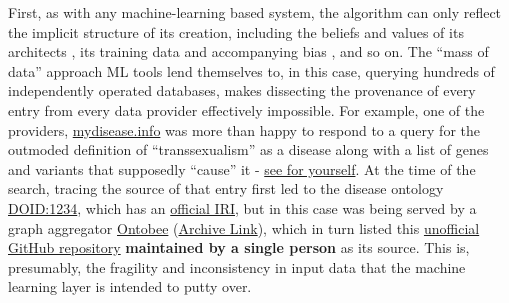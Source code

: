 \documentclass{article}
\begin{document}
First, as with any machine-learning based system, the algorithm can only
reflect the implicit structure of its creation, including the beliefs
and values of its architects \cite{birhaneValuesEncodedMachine2022, birhaneAlgorithmicInjusticeRelational2021} , its training data and
accompanying bias \cite{birhaneMultimodalDatasetsMisogyny2021} ,
and so on. The ``mass of data'' approach ML tools lend themselves to, in
this case, querying hundreds of independently operated databases, makes
dissecting the provenance of every entry from every data provider
effectively impossible. For example, one of the providers,
\href{https://mydisease.info}{mydisease.info} was more than happy to
respond to a query for the outmoded definition of ``transsexualism'' as
a disease \cite{ramTransphobiaEncodedExamination2021}  along with
a list of genes and variants that supposedly ``cause'' it -
\href{https://web.archive.org/web/20230315040436/mydisease.info/v1/query?q=\%22DOID\%3A10919\%22}{see
for yourself}. At the time of the search, tracing the source of that
entry first led to the disease ontology
\href{https://web.archive.org/web/20211007053446/https://www.ebi.ac.uk/ols/ontologies/doid/terms?iri=http\%3A\%2F\%2Fpurl.obolibrary.org\%2Fobo\%2FDOID_1234}{DOID:1234},
which has an \href{http://purl.obolibrary.org/obo/doid.owl}{official
IRI}, but in this case was being served by a graph aggregator
\href{http://www.ontobee.org/ontology/DOID?iri=http://purl.obolibrary.org/obo/DOID_1234}{Ontobee}
(\href{https://web.archive.org/web/20210923110103/http://www.ontobee.org/ontology/DOID?iri=http://purl.obolibrary.org/obo/DOID_1234}{Archive
Link}), which in turn listed this
\href{https://github.com/jannahastings/mental-functioning-ontology}{unofficial
GitHub repository} \textbf{maintained by a single person} as its
source. This is,
presumably, the fragility and inconsistency in input data that the
machine learning layer is intended to putty over.
\end{document}
